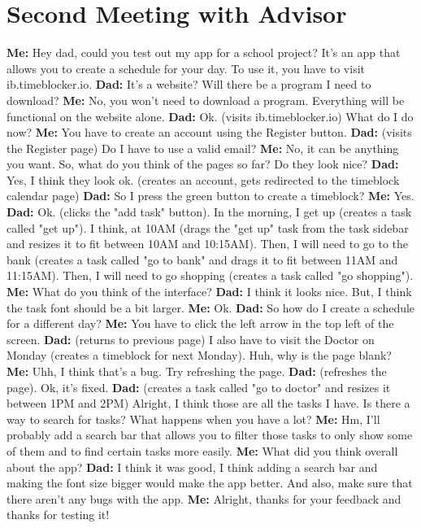 \documentclass[12pt]{report}
\begin{document}
\section*{Second Meeting with Advisor}
\textbf{Me:} Hey dad, could you test out my app for a school project? It's an app that allows you to create a schedule for your day. To use it, you have to visit ib.timeblocker.io.
\textbf{Dad:} It's a website? Will there be a program I need to download?
\textbf{Me:} No, you won't need to download a program. Everything will be functional on the website alone.
\textbf{Dad:} Ok. (visits ib.timeblocker.io) What do I do now?
\textbf{Me:} You have to create an account using the Register button.
\textbf{Dad:} (visits the Register page) Do I have to use a valid email?
\textbf{Me:} No, it can be anything you want. So, what do you think of the pages so far? Do they look nice?
\textbf{Dad:} Yes, I think they look ok. (creates an account, gets redirected to the timeblock calendar page)
\textbf{Dad:} So I press the green button to create a timeblock?
\textbf{Me:} Yes.
\textbf{Dad:} Ok. (clicks the "add task" button). In the morning, I get up (creates a task called "get up"). I think, at 10AM (drags the "get up" task from the task sidebar and resizes it to fit between 10AM and 10:15AM). Then, I will need to go to the bank (creates a task called "go to bank" and drags it to fit between 11AM and 11:15AM). Then, I will need to go shopping (creates a task called "go shopping").
\textbf{Me:} What do you think of the interface?
\textbf{Dad:} I think it looks nice. But, I think the task font should be a bit larger.
\textbf{Me:} Ok.
\textbf{Dad:} So how do I create a schedule for a different day?
\textbf{Me:} You have to click the left arrow in the top left of the screen.
\textbf{Dad:} (returns to previous page) I also have to visit the Doctor on Monday (creates a timeblock for next Monday). Huh, why is the page blank?
\textbf{Me:} Uhh, I think that's a bug. Try refreshing the page.
\textbf{Dad:} (refreshes the page). Ok, it's fixed.
\textbf{Dad:} (creates a task called "go to doctor" and resizes it between 1PM and 2PM) Alright, I think those are all the tasks I have. Is there a way to search for tasks? What happens when you have a lot?
\textbf{Me:} Hm, I'll probably add a search bar that allows you to filter those tasks to only show some of them and to find certain tasks more easily.
\textbf{Me:} What did you think overall about the app?
\textbf{Dad:} I think it was good, I think adding a search bar and making the font size bigger would make the app better. And also, make sure that there aren't any bugs with the app.
\textbf{Me:} Alright, thanks for your feedback and thanks for testing it!
\end{document}
